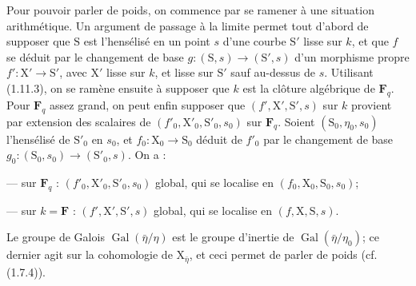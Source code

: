 \documentclass[11pt,leqno]{article}
\begin{document}
Pour pouvoir parler de poids, on commence par se ramener à une situation arithmétique. Un argument de passage à la limite permet tout d’abord de supposer que \(\mathrm S\) est l’hensélisé en un point \(s\) d’une courbe \(\mathrm S'\) lisse sur \(k\), et que \(f\) se déduit par le changement de base \(g:(\mathrm S,s)\to(\mathrm S',s)\) d’un morphisme propre \(f':\mathrm X'\to\mathrm S'\), avec \(\mathrm X'\) lisse sur \(k\), et lisse sur \(\mathrm S'\) sauf au-dessus de \(s\). Utilisant (1.11.3), on se ramène ensuite à supposer que \(k\) est la clôture algébrique de \(\mathbf F_q\). Pour \(\mathbf F_q\) assez grand, on peut enfin supposer que \((f',\mathrm X',\mathrm S',s)\) sur \(k\) provient par extension des scalaires de \((f'_0,\mathrm X'_0,\mathrm S'_0,s_0)\) sur \(\mathbf F_q\). Soient \((\mathrm S_0,\eta_0,s_0)\) l’hensélisé de \(\mathrm S'_0\) en \(s_0\), et \(f_0:\mathrm X_0\to\mathrm S_0\) déduit de \(f'_0\) par le changement de base \(g_0:(\mathrm S_0,s_0)\to(\mathrm S'_0,s)\). On a :

\noindent — sur \(\mathbf F_q\) : \((f'_0,\mathrm X'_0,\mathrm S'_0,s_0)\) global, qui se localise en \((f_0,\mathrm X_0,\mathrm S_0,s_0)\);

\noindent — sur \(k=\mathbf F\) : \((f',\mathrm X',\mathrm S',s)\) global, qui se localise en \((f,\mathrm X,\mathrm S,s)\).

Le groupe de Galois \(\operatorname{Gal}(\bar\eta/\eta)\) est le groupe d’inertie de \(\operatorname{Gal}(\bar\eta/\eta_0)\); ce dernier agit sur la cohomologie de \(\mathrm X_{\bar\eta}\), et ceci permet de parler de poids (cf. (1.7.4)).
\end{document}

